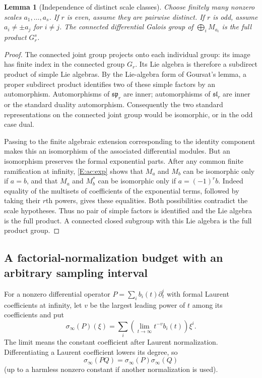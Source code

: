 \documentclass[11pt,a4paper]{article}
\newtheorem{lemma}[theorem]{Lemma}
\theoremstyle{definition}
\theoremstyle{remark}
\numberwithin{equation}{section}
\begin{document}
\begin{lemma}[Independence of distinct scale classes]
\label{E:ac:independence}
Choose finitely many nonzero scales $a_1,\ldots,a_s$.
If $r$ is even, assume they are pairwise distinct. If $r$ is odd,
assume $a_i\ne\pm a_j$ for $i\ne j$. The connected differential
Galois group of $\bigoplus_i M_{a_i}$ is the full product
$G_r^s$.
\end{lemma}
\begin{proof}
The connected joint group projects onto each individual group:
its image has finite index in the connected group $G_r$.
Its Lie algebra is therefore a subdirect product of simple Lie
algebras. By the Lie-algebra form of Goursat's lemma, a proper
subdirect product identifies two of these simple factors by an
automorphism. Automorphisms of $\mathfrak{sp}_r$ are inner;
automorphisms of $\mathfrak{sl}_r$ are inner or the standard duality
automorphism. Consequently the two standard representations on the
connected joint group would be isomorphic, or in the odd case dual.

Passing to the finite algebraic extension corresponding to the
identity component makes this an isomorphism of the associated
differential modules. But an isomorphism preserves the formal
exponential parts. After any common finite ramification at infinity,
\eqref{E:ac:exp} shows that $M_a$ and $M_b$ can be isomorphic only if
$a=b$, and that $M_a$ and $M_b^*$ can be isomorphic only if
$a=(-1)^r b$. Indeed equality of the multisets of coefficients of
the exponential terms, followed by taking their $r$th powers, gives
these equalities. Both possibilities contradict the scale hypotheses.
Thus no pair of simple factors is identified and the Lie algebra is
the full product. A connected closed subgroup with this Lie algebra
is the full product group.
\end{proof}


\subsection{A factorial-normalization budget with an arbitrary sampling interval}

For a nonzero differential operator $P=\sum_i b_i(t)\partial_t^i$
with formal Laurent coefficients at infinity, let $v$ be the largest
leading power of $t$ among its coefficients and put
\[
 \sigma_\infty(P)(\xi)
 =\sum_i\left(\lim_{t\to\infty}t^{-v}b_i(t)\right)\xi^i.
\]
The limit means the constant coefficient after Laurent normalization.
Differentiating a Laurent coefficient lowers its degree, so
\begin{equation}\label{E:ac:symbol-product}
 \sigma_\infty(PQ)=\sigma_\infty(P)\sigma_\infty(Q)
\end{equation}
(up to a harmless nonzero constant if another normalization is used).
\end{document}
